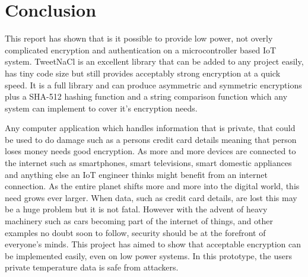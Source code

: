 


\chapter{Conclusion}
\label{conc}

This report has shown that is it possible to provide low power, not overly complicated encryption and authentication on a microcontroller based IoT system. TweetNaCl is an excellent library that can be added to any project easily, has tiny code size but still provides acceptably strong encryption at a quick speed. It is a full library and can produce asymmetric and symmetric encryptions plus a SHA-512 hashing function and a string comparison function which any system can implement to cover it's encryption needs.

Any computer application which handles information that is private, that could be used to do damage such as a persons credit card details meaning that person loses money needs good encryption. As more and more devices are connected to the internet such as smartphones, smart televisions, smart domestic appliances and anything else an IoT engineer thinks might benefit from an internet connection. As the entire planet shifts more and more into the digital world, this need grows ever larger. When data, such as credit card details, are lost this may be a huge problem but it is not fatal. However with the advent of heavy machinery such as cars becoming part of the internet of things, and other examples no doubt soon to follow, security should be at the forefront of everyone's minds. This project has aimed to show that acceptable encryption can be implemented easily, even on low power systems. In this prototype, the users private temperature data is safe from attackers. 

